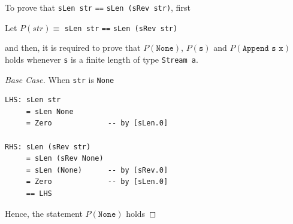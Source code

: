 \documentclass[12pt]{article}
\newcommand{\haskell}{\texttt}
\begin{document}
\noindent To prove that \haskell{sLen str} \haskell{==} 
\haskell{sLen (sRev str)}, first
\begin{center}
Let $P(str) \equiv$ \haskell{sLen str} \haskell{==} \haskell{sLen (sRev str)}
\end{center}
and then, it is required to prove that $P(\haskell{None})$, $P(\haskell{s})$ and $P(\haskell{Append s x})$ holds whenever \haskell{s} is a finite length of type \haskell{Stream a}.

\newpage
\begin{proof}[Base Case]
When \haskell{str} is \haskell{None}
\begin{mdframed}
\begin{verbatim}
LHS: sLen str 
     = sLen None
     = Zero             -- by [sLen.0]

RHS: sLen (sRev str) 
     = sLen (sRev None)
     = sLen (None)      -- by [sRev.0]
     = Zero             -- by [sLen.0]
     == LHS
\end{verbatim}
\end{mdframed}
Hence, the statement $P(\haskell{None})$ holds
\bigskip
\end{proof}
\end{document}

